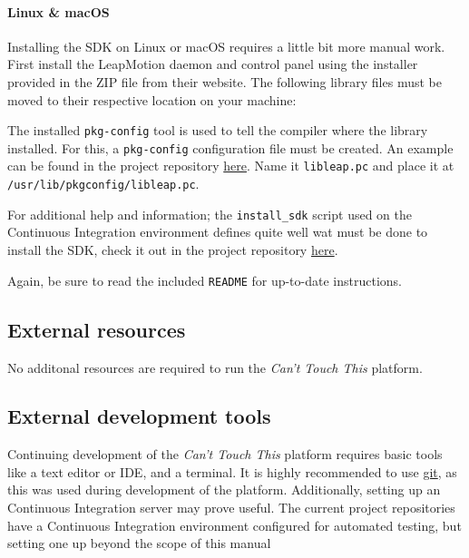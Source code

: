 \documentclass{standalone}
\begin{document}
\paragraph{Linux \& macOS}
  Installing the SDK on Linux or macOS requires a little bit more manual work.
  First install the LeapMotion daemon and control panel using the installer
  provided in the ZIP file from their website.
  The following library files must be moved to their respective location on your
  machine:
  

  The installed \verb_pkg-config_ tool is used to tell the compiler where the
  library installed. For this, a \verb_pkg-config_ configuration file must be
  created. An example can be found in the project repository
  \href{https://gitlab.com/timvisee/cant-touch-this/blob/ece65fab15b3c088e57628dc0c82474efddbbfd2/ci/libleap.pc}{here}.
  Name it \verb_libleap.pc_ and place it at
  \verb_/usr/lib/pkgconfig/libleap.pc_.

  For additional help and information; the \verb`install_sdk` script used on
  the Continuous Integration environment defines quite well wat must be done
  to install the SDK, check it out in the project repository
  \href{https://gitlab.com/timvisee/cant-touch-this/blob/ece65fab15b3c088e57628dc0c82474efddbbfd2/ci/install_sdk}{here}.

  Again, be sure to read the included \verb_README_ for up-to-date instructions.

  \subsection{External resources}
  No additonal resources are required to run the \textit{Can't Touch This}
  platform.

  \subsection{External development tools}
  Continuing development of the \textit{Can't Touch This} platform requires
  basic tools like a text editor or IDE, and a terminal. It is highly
  recommended to use \href{https://git-scm.com/}{git}, as this was used during
  development of the platform. Additionally, setting up an Continuous Integration server may prove
  useful. The current project repositories have a Continuous Integration
  environment configured for automated testing, but setting one up beyond the
  scope of this manual 

  \clearpage
\end{document}
